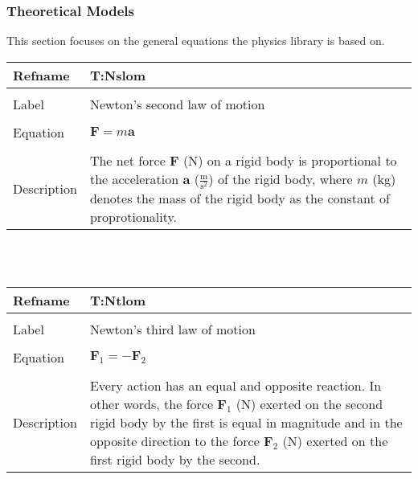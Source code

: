 \documentclass[12pt]{article}
\begin{document}
\subsubsection{Theoretical Models}
\label{Sec:TMs}
This section focuses on the general equations the physics library is based on.
~\newline
\noindent \begin{minipage}{\textwidth}
\begin{tabular}{p{} p{}}
\toprule \textbf{Refname} & \textbf{T:Nslom}
\label{T:Nslom}
\\ \midrule \\
Label & Newton's second law of motion
\\ \midrule \\
Equation & $\mathbf{F}=m\mathbf{a}$
\\ \midrule \\
Description & The net force $\mathbf{F}$ (N) on a rigid body is proportional to the acceleration $\mathbf{a}$ ($\frac{\text{m}}{\text{s}^{2}}$) of the rigid body, where $m$ (kg) denotes the mass of the rigid body as the constant of proprotionality.
\\ \bottomrule \end{tabular}
\end{minipage}\\
~\newline
\noindent \begin{minipage}{\textwidth}
\begin{tabular}{p{} p{}}
\toprule \textbf{Refname} & \textbf{T:Ntlom}
\label{T:Ntlom}
\\ \midrule \\
Label & Newton's third law of motion
\\ \midrule \\
Equation & $\mathbf{F}_{1}=-\mathbf{F}_{2}$
\\ \midrule \\
Description & Every action has an equal and opposite reaction. In other words, the force $\mathbf{F}_{1}$ (N) exerted on the second rigid body by the first is equal in magnitude and in the opposite direction to the force $\mathbf{F}_{2}$ (N) exerted on the first rigid body by the second.
\\ \bottomrule \end{tabular}
\end{minipage}\\
~\newline
\end{document}
